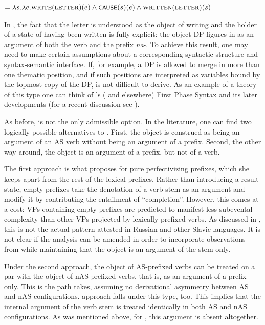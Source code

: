 \documentclass[output=paper,colorlinks,citecolor=brown]{langscibook}
\begin{document}
\ea   {} $= \lambda s.\lambda e. \textsc{write}(\textsc{letter})(e) \wedge \cnst{cause}(s)(e) \wedge  \textsc{written}(\textsc{letter})(s)$\label{ex:tatevosov:95}
\z

\noindent In , the fact that the letter is understood as the object of writing and the holder of a state of having been written is fully explicit: the object DP figures in  as an argument of both the verb and the prefix \textit{na}-. To achieve this result, one may need to make certain assumptions about a corresponding syntactic structure and syntax-semantic interface. If, for example, a DP is allowed to merge in more than one thematic position, and if such positions are interpreted as variables bound by the topmost copy of the DP,  is not difficult to derive. As an example of a theory of this type one can think of \citeauthor{Ramchand2008}'s (\citeyear{Ramchand2008} and elsewhere) First Phase Syntax and its later developments (for a recent discussion see \citealt{Svenonius2016}).

As before,  is not the only admissible option. In the literature, one can find two logically possible alternatives to . First, the object is construed as being an argument of an AS verb without being an argument of a prefix. Second, the other way around, the object is an argument of a prefix, but not of a verb.

The first approach is what \citet[55-56]{BabkoMalaya1999} proposes for pure perfectivizing prefixes, which she keeps apart from the rest of the lexical prefixes. Rather than introducing a result state, empty prefixes take the denotation of a verb stem as an argument and modify it by contributing the entailment of “completion”. However, this comes at a cost: VPs containing empty prefixes are predicted to manifest less subevental complexity than other VPs projected by lexically prefixed verbs. As discussed in , this is not the actual pattern attested in Russian and other Slavic languages. It is not clear if the analysis can be amended in order to incorporate observations from  while maintaining that the object is an argument of the stem only. 

Under the second approach, the object of AS-prefixed verbs can be treated on a par with the object of nAS-prefixed verbs, that is, as an argument of a prefix only. This is the path \citet{Biskup2019} takes, assuming no derivational asymmetry between AS and nAS configurations.  approach falls under this type, too. This implies that the internal argument of the verb stem is treated identically in both AS and nAS configurations. As was mentioned above, for \citet{Biskup2019}, this argument is absent altogether. 
\end{document}
